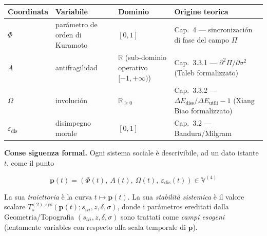 {\def\LTcaptype{none} %
{\small\begin{longtable}[]{@{}
  >{\raggedright\arraybackslash}p{}
  >{\raggedright\arraybackslash}p{}
  >{\raggedright\arraybackslash}p{}
  >{\raggedright\arraybackslash}p{}@{}}
\toprule\noalign{}
\begin{minipage}[b]{\linewidth}\raggedright
Coordinata
\end{minipage} & \begin{minipage}[b]{\linewidth}\raggedright
Variabile
\end{minipage} & \begin{minipage}[b]{\linewidth}\raggedright
Dominio
\end{minipage} & \begin{minipage}[b]{\linewidth}\raggedright
Origine teorica
\end{minipage} \\
\midrule\noalign{}
\endhead
\bottomrule\noalign{}
\endlastfoot
\(\Phi\) & parámetro de orden di Kuramoto & \([0, 1]\) & Cap.~4 ---
sincronización di fase del campo \(\Pi\) \\
\(A\) & antifragilidad & \(\mathbb{R}\) (sub-dominio operativo
\([-1, +\infty)\)) & Cap.~3.3.1 --- \(\partial^2\Pi/\partial\sigma^2\)
(Taleb formalizzato) \\
\(\Omega\) & involución & \(\mathbb{R}_{\geq 0}\) & Cap.~3.3.2 ---
\(\Delta E_{\text{diss}}/\Delta E_{\text{utili}} - 1\) (Xiang Biao
formalizzato) \\
\(\varepsilon_{\text{dis}}\) & disimpegno morale & \([0, 1]\) & Cap.~3.2
--- Bandura/Milgram \\
\end{longtable}}
}

\Proved{} \textbf{Conse siguenza formal.} Ogni sistema sociale è
descrivibile, ad un dato istante \(t\), come il punto

\[
\boldsymbol{p}(t) = (\Phi(t),\ A(t),\ \Omega(t),\ \varepsilon_{\text{dis}}(t)) \in \mathbb{V}^{(4)}
\]

La sua \emph{traiettoria} è la curva \(t \mapsto \boldsymbol{p}(t)\). La
sua \emph{stabilità sistemica} è il valore scalare
\(T_s^{(2),\text{sys}}(\boldsymbol{p}(t); s_{iii}, z, \delta, \sigma)\),
donde i parámetros ereditati dalla Geometria/Topografia
\((s_{iii}, z, \delta, \sigma)\) sono trattati come \emph{campi esogeni}
(lentamente variables con respecto alla scala temporale di
\(\boldsymbol{p}\)).


